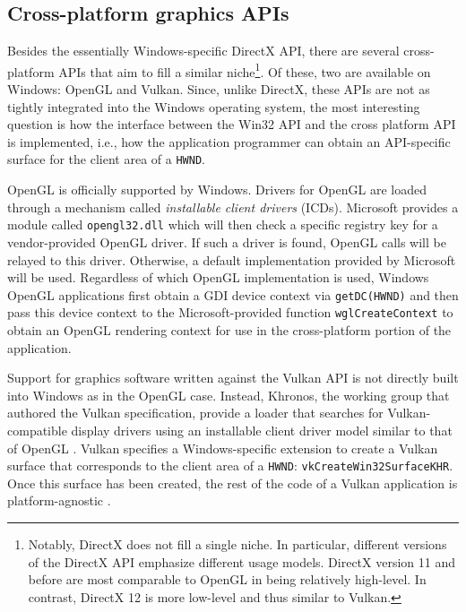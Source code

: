 \documentclass[10pt,twocolumn,a4paper]{article}
\begin{document}
		\subsection{Cross-platform graphics APIs}
			Besides the essentially Windows-specific DirectX API, there are several
			cross-platform APIs that aim to fill a similar niche\footnote{Notably,
			DirectX does not fill a single niche. In particular,
			different versions of the DirectX API emphasize different usage models.
			DirectX version 11 and before are most comparable to OpenGL in being
			relatively high-level. In contrast, DirectX 12 is more low-level and
			thus similar to Vulkan.}. Of these, two are available on Windows: OpenGL
			and Vulkan. Since, unlike DirectX, these APIs are not as tightly integrated
			into the Windows operating system, the most interesting question is
			how the interface between the Win32 API and the cross platform API
			is implemented, i.e., how the application programmer can obtain an
			API-specific surface for the client area of a \texttt{HWND}.

			OpenGL is officially supported by Windows. Drivers for OpenGL are
			loaded through a mechanism called \textit{installable client
			drivers} (ICDs). Microsoft provides a module called
			\texttt{opengl32.dll} which will then check a specific registry key
			for a vendor-provided OpenGL driver. If such a driver is found,
			OpenGL calls will be relayed to this driver. Otherwise, a
			default implementation provided by Microsoft will be used. Regardless
			of which OpenGL implementation is used, Windows OpenGL applications first obtain
			a GDI device context via \texttt{getDC(HWND)} and then pass this device
			context to the Microsoft-provided function \texttt{wglCreateContext}
			to obtain an OpenGL rendering context for use in the cross-platform portion
			of the application. \cite{oglrc,oglicd}

			Support for graphics software written against the Vulkan API is not
			directly built into Windows as in the OpenGL case. Instead,
			Khronos, the working group that authored the Vulkan specification,
			provide a loader that searches for Vulkan-compatible display
			drivers using an installable client driver model similar to that of
			OpenGL \cite{vulkanloader}. Vulkan specifies a Windows-specific
			extension to create a Vulkan surface that corresponds to the client
			area of a \texttt{HWND}: \texttt{vkCreateWin32SurfaceKHR}. Once
			this surface has been created, the rest of the code of a Vulkan
			application is platform-agnostic \cite{vulkanspec}.
\end{document}
